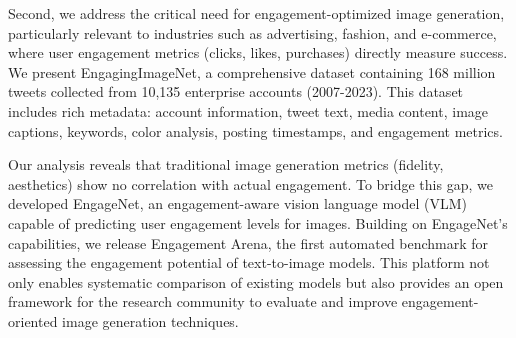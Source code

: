 Second, we address the critical need for engagement-optimized image generation, particularly relevant to industries such as advertising, fashion, and e-commerce, where user engagement metrics (clicks, likes, purchases) directly measure success. We present EngagingImageNet, a comprehensive dataset containing 168 million tweets collected from 10,135 enterprise accounts (2007-2023). This dataset includes rich metadata: account information, tweet text, media content, image captions, keywords, color analysis, posting timestamps, and engagement metrics. 

Our analysis reveals that traditional image generation metrics (fidelity, aesthetics) show no correlation with actual engagement. To bridge this gap, we developed EngageNet, an engagement-aware vision language model (VLM) capable of predicting user engagement levels for images. Building on EngageNet's capabilities, we release Engagement Arena, the first automated benchmark for assessing the engagement potential of text-to-image models. This platform not only enables systematic comparison of existing models but also provides an open framework for the research community to evaluate and improve engagement-oriented image generation techniques.









